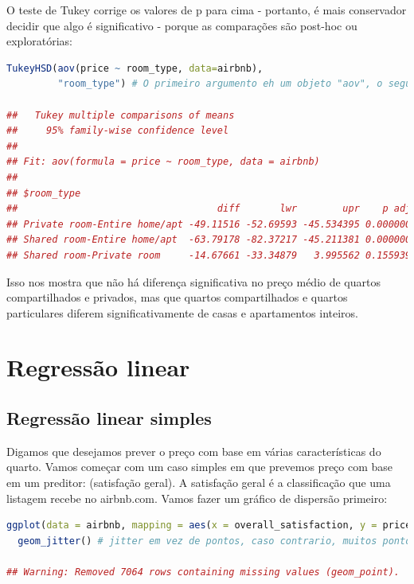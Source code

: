 \documentclass{article}
\begin{document}
O teste de Tukey corrige os valores de p para cima - portanto, é mais conservador decidir que algo é significativo - porque as comparações são post-hoc ou exploratórias:

\begin{lstlisting}[language=R]
TukeyHSD(aov(price ~ room_type, data=airbnb), 
         "room_type") # O primeiro argumento eh um objeto "aov", o segundo eh a nossa variavel independente.
         
##   Tukey multiple comparisons of means
##     95% family-wise confidence level
## 
## Fit: aov(formula = price ~ room_type, data = airbnb)
## 
## $room_type
##                                   diff       lwr        upr    p adj
## Private room-Entire home/apt -49.11516 -52.69593 -45.534395 0.000000
## Shared room-Entire home/apt  -63.79178 -82.37217 -45.211381 0.000000
## Shared room-Private room     -14.67661 -33.34879   3.995562 0.155939
\end{lstlisting}

Isso nos mostra que não há diferença significativa no preço médio de quartos compartilhados e privados, mas que quartos compartilhados e quartos particulares diferem significativamente de casas e apartamentos inteiros.

\section{Regressão linear}
\subsection{Regressão linear simples}

Digamos que desejamos prever o preço com base em várias características do quarto. Vamos começar com um caso simples em que prevemos preço com base em um preditor:  (satisfação geral). A satisfação geral é a classificação que uma listagem recebe no airbnb.com. Vamos fazer um gráfico de dispersão primeiro:

\begin{lstlisting}[language=R]
ggplot(data = airbnb, mapping = aes(x = overall_satisfaction, y = price)) +
  geom_jitter() # jitter em vez de pontos, caso contrario, muitos pontos sao desenhados um sobre o outro
 
## Warning: Removed 7064 rows containing missing values (geom_point).
\end{lstlisting}
\end{document}
